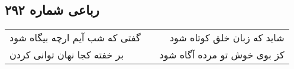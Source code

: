 \begin{center}
\section*{رباعی شماره ۲۹۲}
\label{sec:sh292}
\begin{longtable}{l p{0.5cm} r}
گفتی که شب آیم ارچه بیگاه شود
&&
شاید که زبان خلق کوتاه شود
\\
بر خفته کجا نهان توانی کردن
&&
کز بوی خوش تو مرده آگاه شود
\\
\end{longtable}
\end{center}

